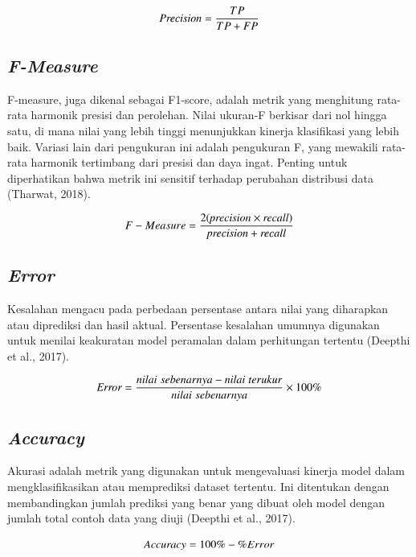 \begin{equation}
  \label{eq:KonversiPanjangLangkah}
  \emph{Precision} = \frac{TP}{TP + FP}
\end{equation}

\subsection{\emph{F-Measure}}
\label{subsec:cnn}

F-measure, juga dikenal sebagai F1-score, adalah metrik yang menghitung rata-rata harmonik presisi dan perolehan. Nilai ukuran-F berkisar dari nol hingga satu, di mana nilai yang lebih tinggi menunjukkan kinerja klasifikasi yang lebih baik. Variasi lain dari pengukuran ini adalah pengukuran F, yang mewakili rata-rata harmonik tertimbang dari presisi dan daya ingat. Penting untuk diperhatikan bahwa metrik ini sensitif terhadap perubahan distribusi data (Tharwat, 2018).

\begin{equation}
  \label{eq:KonversiPanjangLangkah}
  F-Measure = \frac{2 (\emph{precision}\times\emph{recall})}{\emph{precision} + \emph{recall}}
\end{equation}

\subsection{\emph{Error}}
\label{subsec:cnn}

Kesalahan mengacu pada perbedaan persentase antara nilai yang diharapkan atau diprediksi dan hasil aktual. Persentase kesalahan umumnya digunakan untuk menilai keakuratan model peramalan dalam perhitungan tertentu (Deepthi et al., 2017).

\begin{equation}
  \label{eq:KonversiPanjangLangkah}
  \emph{Error} = \frac{nilai \; sebenarnya - nilai \; terukur}{nilai \; sebenarnya} \times 100\%
\end{equation}

\subsection{\emph{Accuracy}}
\label{subsec:cnn}

Akurasi adalah metrik yang digunakan untuk mengevaluasi kinerja model dalam mengklasifikasikan atau memprediksi dataset tertentu. Ini ditentukan dengan membandingkan jumlah prediksi yang benar yang dibuat oleh model dengan jumlah total contoh data yang diuji (Deepthi et al., 2017).

\begin{equation}
  \label{eq:KonversiPanjangLangkah}
  \emph{Accuracy} =  100\% - \%Error
\end{equation}